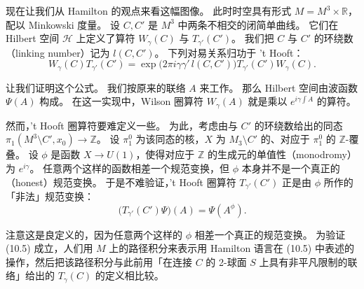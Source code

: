 现在让我们从 Hamilton 的观点来看这幅图像。
此时时空具有形式 $M=M^3\times\mathbb{R}$，配以 Minkowski 度量。
设 $C,C'$ 是 $M^3$ 中两条不相交的闭简单曲线。
它们在 Hilbert 空间 $\mathcal{H}$ 上定义了算符 $W_\gamma(C)$ 与 $T_{\gamma'}(C')$。
我们把 $C$ 与 $C'$ 的环绕数（linking number）记为 $l(C,C')$。
下列对易关系归功于 't Hooft：
\begin{equation}\tag{10.4}\label{eq:10-4}
W_\gamma(C)T_{\gamma'}(C')=\exp\bigl(2\pi i\gamma\gamma'\,l(C,C')\bigr)T_{\gamma'}(C')W_\gamma(C).
\end{equation}


让我们证明这个公式。
我们按原来的联络 $A$ 来工作。
那么 Hilbert 空间由波函数 $\Psi(A)$ 构成。
在这一实现中，Wilson 圈算符 $W_\gamma(A)$ 就是乘以 $e^{i\gamma\int A}$ 的算符。

然而，'t Hooft 圈算符要难定义一些。
为此，考虑由与 $C'$ 的环绕数给出的同态 $\pi_1(M^3\setminus C',x_0)\to\mathbb{Z}$。
设 $\pi_1^0$ 为该同态的核，$X$ 为 $M_3\setminus C'$ 的、对应于 $\pi_1^0$ 的 $\mathbb{Z}$-覆叠。
设 $\phi$ 是函数 $X\to U(1)$，使得对应于 $\mathbb{Z}$ 的生成元的单值性（monodromy）为 $e^{i\gamma}$。
任意两个这样的函数相差一个规范变换，但 $\phi$ 本身并不是一个真正的（honest）规范变换。
于是不难验证，'t Hooft 圈算符 $T_{\gamma'}(C')$ 正是由 $\phi$ 所作的「非法」规范变换：
\begin{equation}\tag{10.5}\label{eq:10-5}
\bigl(T_{\gamma'}(C')\Psi\bigr)(A)=\Psi(A^\phi).
\end{equation}


注意这是良定义的，因为任意两个这样的 $\phi$ 相差一个真正的规范变换。
为验证 (10.5) 成立，人们用 $M$ 上的路径积分来表示用 Hamilton 语言在 (10.5) 中表述的操作，然后把该路径积分与此前用「在连接 $C$ 的 2-球面 $S$ 上具有非平凡限制的联络」给出的 $T_\gamma(C)$ 的定义相比较。

